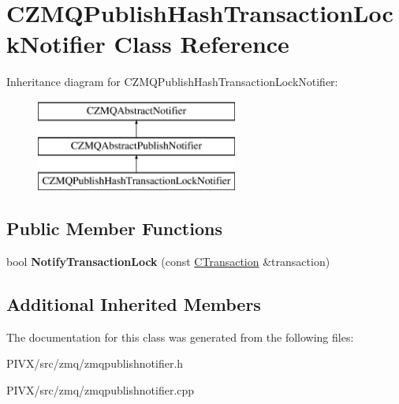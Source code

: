 \hypertarget{class_c_z_m_q_publish_hash_transaction_lock_notifier}{}\section{C\+Z\+M\+Q\+Publish\+Hash\+Transaction\+Lock\+Notifier Class Reference}
\label{class_c_z_m_q_publish_hash_transaction_lock_notifier}
Inheritance diagram for C\+Z\+M\+Q\+Publish\+Hash\+Transaction\+Lock\+Notifier\+:\begin{figure}[H]
\begin{center}
\leavevmode
\includegraphics[height=3.000000cm]{class_c_z_m_q_publish_hash_transaction_lock_notifier}
\end{center}
\end{figure}
\subsection*{Public Member Functions}
\begin{DoxyCompactItemize}
\item 
\mbox{\label{class_c_z_m_q_publish_hash_transaction_lock_notifier_aa1cd9bd83e39750a62d92d37a2242fe1}} 
bool {\bfseries Notify\+Transaction\+Lock} (const \mbox{\hyperlink{class_c_transaction}{C\+Transaction}} \&transaction)
\end{DoxyCompactItemize}
\subsection*{Additional Inherited Members}


The documentation for this class was generated from the following files\+:\begin{DoxyCompactItemize}
\item 
P\+I\+V\+X/src/zmq/zmqpublishnotifier.\+h\item 
P\+I\+V\+X/src/zmq/zmqpublishnotifier.\+cpp\end{DoxyCompactItemize}
